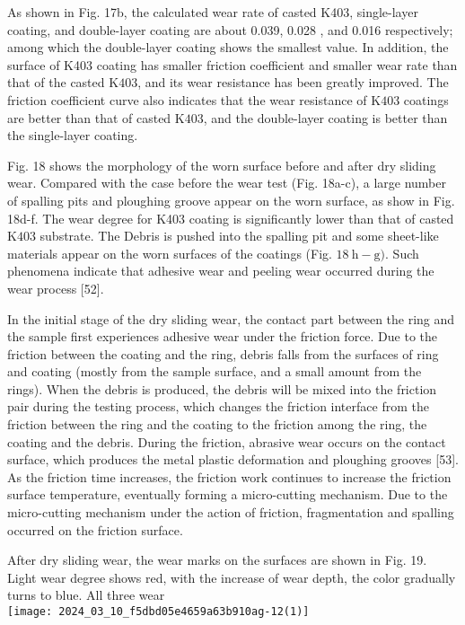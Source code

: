 \documentclass[10pt]{article}
\begin{document}
As shown in Fig. 17b, the calculated wear rate of casted K403, single-layer coating, and double-layer coating are about 0.039, 0.028 , and 0.016 respectively; among which the double-layer coating shows the smallest value. In addition, the surface of K403 coating has smaller friction coefficient and smaller wear rate than that of the casted $\mathrm{K} 403$, and its wear resistance has been greatly improved. The friction coefficient curve also indicates that the wear resistance of $\mathrm{K} 403$ coatings are better than that of casted $\mathrm{K} 403$, and the double-layer coating is better than the single-layer coating.

Fig. 18 shows the morphology of the worn surface before and after dry sliding wear. Compared with the case before the wear test (Fig. 18a-c), a large number of spalling pits and ploughing groove appear on the worn surface, as show in Fig. 18d-f. The wear degree for K403 coating is significantly lower than that of casted $\mathrm{K} 403$ substrate. The Debris is pushed into the spalling pit and some sheet-like materials appear on the worn surfaces of the coatings (Fig. $18 \mathrm{~h}-\mathrm{g})$. Such phenomena indicate that adhesive wear and peeling wear occurred during the wear process [52].

In the initial stage of the dry sliding wear, the contact part between the ring and the sample first experiences adhesive wear under the friction force. Due to the friction between the coating and the ring, debris falls from the surfaces of ring and coating (mostly from the sample surface, and a small amount from the rings). When the debris is produced, the debris will be mixed into the friction pair during the testing process, which changes the friction interface from the friction between the ring and the coating to the friction among the ring, the coating and the debris. During the friction, abrasive wear occurs on the contact surface, which produces the metal plastic deformation and ploughing grooves [53]. As the friction time increases, the friction work continues to increase the friction surface temperature, eventually forming a micro-cutting mechanism. Due to the micro-cutting mechanism under the action of friction, fragmentation and spalling occurred on the friction surface.

After dry sliding wear, the wear marks on the surfaces are shown in Fig. 19. Light wear degree shows red, with the increase of wear depth, the color gradually turns to blue. All three wear\\
\texttt{[image: 2024\_03\_10\_f5dbd05e4659a63b910ag-12(1)]}
\end{document}
